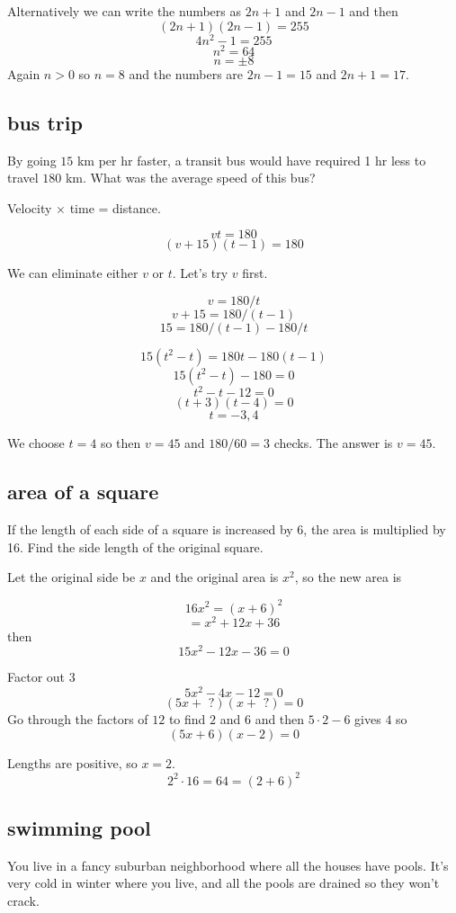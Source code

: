 \documentclass[11pt, oneside]{article}
\begin{document}
Alternatively we can write the numbers as $2n + 1$ and $2n - 1$ and then
\[ (2n + 1)(2n - 1) = 255 \]
\[ 4n^2 - 1 = 255 \]
\[ n^2 = 64 \]
\[ n = \pm 8 \]
Again $n > 0$ so $n = 8$ and the numbers are $2n - 1 = 15$ and $2n + 1 = 17$.

\subsection*{bus trip}

By going $15$ km per hr faster, a transit bus would have required 1 hr less to travel $180$ km. What was the average speed of this bus?

Velocity $\times$ time = distance.

\[ vt = 180 \]
\[ (v + 15)(t - 1) = 180 \]

We can eliminate either $v$ or $t$.  Let's try $v$ first.

\[ v = 180/t \]
\[ v + 15 = 180/(t-1) \]
\[ 15 = 180/(t-1) - 180/t \]

\[ 15(t^2 - t) = 180t - 180(t-1) \]
\[ 15(t^2 - t) - 180 = 0 \]
\[ t^2 - t - 12 = 0 \]
\[ (t + 3)(t - 4) = 0 \]
\[ t = -3,4 \]

We choose $t = 4$ so then $v = 45$ and $180/60 = 3$ checks.
The answer is $v = 45$.

\subsection*{area of a square}

If the length of each side of a square is increased by 6, the area is multiplied by 16. Find the side length of the original square.

Let the original side be $x$ and the original area is $x^2$, so the new area is 

\[ 16x^2 = (x + 6)^2 \]
 \[      = x^2 + 12x + 36 \]
then
\[ 15x^2 - 12x - 36 = 0 \]

Factor out $3$
\[ 5x^2 - 4x - 12 = 0 \]
\[ (5x + \text{ ?})(x + \text{ ?}) = 0 \]
Go through the factors of $12$ to find $2$ and $6$ and then $5 \cdot 2 - 6$ gives $4$ so
\[ (5x + 6)(x - 2) = 0 \]

Lengths are positive, so $x = 2$.
\[ 2^2 \cdot 16 = 64 = (2 + 6)^2  \]

\subsection*{swimming pool}

You live in a fancy suburban neighborhood where all the houses have pools.  It's very cold in winter where you live, and all the pools are drained so they won't crack.
\end{document}
